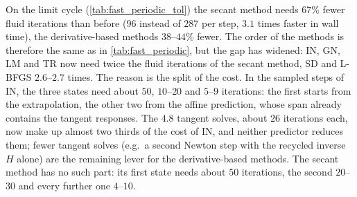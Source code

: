 \documentclass[11pt,a4paper]{article}
\theoremstyle{definition}
\theoremstyle{remark}
\begin{document}
\begin{table}[ht]\centering
\caption{Periodic regime as in \cref{tab:fast_periodic}, with predictor $p=2$, affine state
prediction and $\tau_f=10^{-7}$: per time step iterations, state evaluations, tangent and adjoint
solves, fluid Krylov iterations and wall time; last two columns: fluid iterations and wall time of
the same method on the limit cycle with the old settings (\cref{tab:fast_periodic}). First row:
start-up and growth phase, compared with $[0,14]$ of the old run.}
\label{tab:fast_periodic_tol}
\end{table}

On the limit cycle (\cref{tab:fast_periodic_tol}) the secant method needs $67\%$ fewer fluid
iterations than before ($96$ instead of $287$ per step, $3.1$ times faster in wall time), the
derivative-based methods $38$--$44\%$ fewer. The order of the methods is therefore the same as in
\cref{tab:fast_periodic}, but the gap has widened: IN, GN, LM and TR now need twice the fluid
iterations of the secant method, SD and L-BFGS $2.6$--$2.7$ times. The reason is the split of the
cost. In the sampled steps of IN, the three states need about $50$, $10$--$20$ and $5$--$9$
iterations: the first starts from the extrapolation, the other two from the affine prediction, whose
span already contains the tangent responses. The $4.8$ tangent solves, about $26$ iterations each, now make up
almost two thirds of the cost of IN, and neither predictor reduces them; fewer tangent solves (e.g.\
a second Newton step with the recycled inverse $H$ alone) are the remaining lever for the
derivative-based methods. The secant method has no such part: its first state needs about $50$
iterations, the second $20$--$30$ and every further one $4$--$10$.
\end{document}
